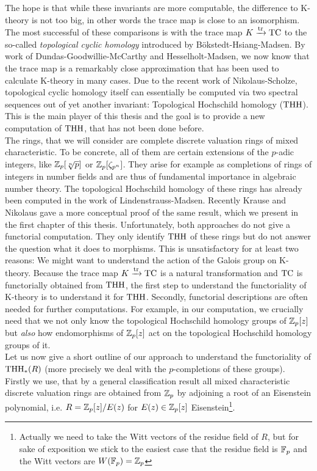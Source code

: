 The hope is that while these invariants are more computable, the difference to K-theory is not too big, in other words the trace map is close to an isomorphism. 
The most successful of these comparisons is with the trace map $K\xrightarrow{\operatorname{tr}} \operatorname{TC}$ to the so-called \textit{topological cyclic homology} introduced by Bökstedt-Hsiang-Madsen.
By work of Dundas-Goodwillie-McCarthy and Hesselholt-Madsen, we now know that the trace map is a remarkably close approximation that has been used to calculate K-theory in many cases.
Due to the recent work of Nikolaus-Scholze, topological cyclic homology itself can essentially be computed via two spectral sequences out of yet another invariant: Topological Hochschild homology ($\operatorname{THH}$).
This is the main player of this thesis and the goal is to provide a new computation of $\operatorname{THH}$, that has not been done before. \\
The rings, that we will consider are complete discrete valuation rings of mixed characteristic. 
To be concrete, all of them are certain extensions of the $p$-adic integers, like $\mathbb{Z}_p[\sqrt[n]{p}]$ or $\mathbb{Z}_p[\zeta_{p^n}]$. They arise for example as completions of rings of integers in number fields and are thus of fundamental importance in algebraic number theory.
The topological Hochschild homology of these rings has already been computed in the work of Lindenstrauss-Madsen. 
Recently Krause and Nikolaus gave a more conceptual proof of the same result, which we present in the first chapter of this thesis. 
Unfortunately, both approaches do not give a functorial computation. They only identify $\operatorname{THH}$ of these rings but do not answer the question what it does to morphisms. 
This is unsatisfactory for at least two reasons: We might want to understand the action of the Galois group on K-theory. Because the trace map $K\xrightarrow{\operatorname{tr}}\operatorname{TC}$ is a natural transformation and $\operatorname{TC}$ is functorially obtained from $\operatorname{THH}$, the first step to understand the functoriality of K-theory is to understand it for $\operatorname{THH}$.
Secondly, functorial descriptions are often needed for further computations. For example, in our computation, we crucially need that we not only know the topological Hochschild homology groups of $\mathbb{Z}_p[z]$ but \textit{also}  
how endomorphisms of $\mathbb{Z}_p[z]$ act on the topological Hochschild homology groups of it. \\
Let us now give a short outline of our approach to understand the functoriality of $\operatorname{THH}_*(R)$ (more precisely we deal with the $p$-completions of these groups).
Firstly we use, that by a general classification result all mixed characteristic discrete valuation rings are obtained from $\mathbb{Z}_p$ by adjoining a root of an Eisenstein polynomial, i.e. $R=\mathbb{Z}_p[z]/E(z)$ for $E(z)\in \mathbb{Z}_p[z]$ Eisenstein\footnote{Actually we need to take the Witt vectors of the residue field of $R$, but for sake of exposition we stick to the easiest case that the residue field is $\mathbb{F}_p$ and the Witt vectors are $W(\mathbb{F}_p)=\mathbb{Z}_p$}.
